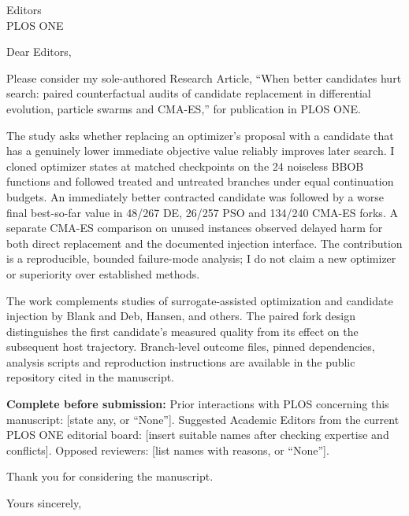 \documentclass[11pt]{letter}
\begin{document}
\begin{letter}{Editors\\PLOS ONE}
\opening{Dear Editors,}

Please consider my sole-authored Research Article, ``When better candidates hurt search: paired counterfactual audits of candidate replacement in differential evolution, particle swarms and CMA-ES,'' for publication in PLOS ONE.

The study asks whether replacing an optimizer's proposal with a candidate that has a genuinely lower immediate objective value reliably improves later search. I cloned optimizer states at matched checkpoints on the 24 noiseless BBOB functions and followed treated and untreated branches under equal continuation budgets. An immediately better contracted candidate was followed by a worse final best-so-far value in 48/267 DE, 26/257 PSO and 134/240 CMA-ES forks. A separate CMA-ES comparison on unused instances observed delayed harm for both direct replacement and the documented injection interface. The contribution is a reproducible, bounded failure-mode analysis; I do not claim a new optimizer or superiority over established methods.

The work complements studies of surrogate-assisted optimization and candidate injection by Blank and Deb, Hansen, and others. The paired fork design distinguishes the first candidate's measured quality from its effect on the subsequent host trajectory. Branch-level outcome files, pinned dependencies, analysis scripts and reproduction instructions are available in the public repository cited in the manuscript.

\textbf{Complete before submission:} Prior interactions with PLOS concerning this manuscript: [state any, or ``None'']. Suggested Academic Editors from the current PLOS ONE editorial board: [insert suitable names after checking expertise and conflicts]. Opposed reviewers: [list names with reasons, or ``None''].

Thank you for considering the manuscript.

\closing{Yours sincerely,}
\end{letter}
\end{document}
